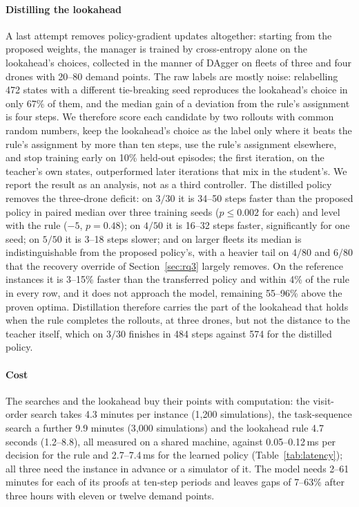 \documentclass[final,5p,times,twocolumn]{elsarticle}
\begin{document}
\paragraph{Distilling the lookahead}
A last attempt removes policy-gradient updates altogether: starting from the proposed weights, the
manager is trained by cross-entropy alone on the lookahead's choices, collected in the manner of
DAgger \cite{ross2011} on fleets of three and four drones with 20--80 demand points. The raw labels
are mostly noise: relabelling 472 states with a different tie-breaking seed reproduces the
lookahead's choice in only 67\% of them, and the median gain of a deviation from the rule's
assignment is four steps. We therefore score each candidate by two rollouts with common random
numbers, keep the lookahead's choice as the label only where it beats the rule's assignment by
more than ten steps, use the rule's assignment elsewhere, and stop training early on 10\% held-out
episodes; the first iteration, on the teacher's own states, outperformed later iterations that mix
in the student's. We report the result as an analysis, not as a third controller. The distilled
policy removes the three-drone deficit: on $3/30$ it is 34--50 steps faster than the proposed
policy in paired median over three training seeds ($p \le 0.002$ for each) and level with the rule
($-5$, $p = 0.48$); on $4/50$ it is 16--32 steps faster, significantly for one seed; on $5/50$ it
is 3--18 steps slower; and on larger fleets its median is indistinguishable from the proposed
policy's, with a heavier tail on $4/80$ and $6/80$ that the recovery override of
Section~\ref{sec:rq3} largely removes. On the reference instances it is 3--15\% faster than the
transferred policy and within 4\% of the rule in every row, and it does not approach the model,
remaining 55--96\% above the proven optima. Distillation therefore carries the part of the
lookahead that holds when the rule completes the rollouts, at three drones, but not the distance to
the teacher itself, which on $3/30$ finishes in 484 steps against 574 for the distilled policy.



\paragraph{Cost}
The searches and the lookahead buy their points with computation: the visit-order search takes
4.3 minutes per instance (1{,}200 simulations), the task-sequence search a further 9.9 minutes
(3{,}000 simulations) and the lookahead rule 4.7 seconds (1.2--8.8), all measured on a shared machine, against 0.05--0.12\,ms per decision for the rule and 2.7--7.4\,ms for the learned
policy (Table~\ref{tab:latency}); all three need the instance in advance or a simulator of it.
The model needs 2--61 minutes for each of its proofs at ten-step periods and leaves gaps of
7--63\% after three hours with eleven or twelve demand points.
\end{document}
